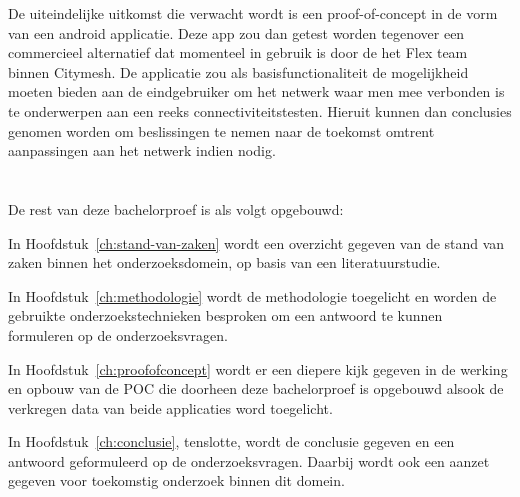 De uiteindelijke uitkomst die verwacht wordt is een proof-of-concept in de vorm van een android applicatie. Deze app zou dan getest worden tegenover een commercieel alternatief dat momenteel in gebruik is door de het Flex team binnen Citymesh. De applicatie zou als basisfunctionaliteit de mogelijkheid moeten bieden aan de eindgebruiker om het netwerk waar men mee verbonden is te onderwerpen aan een reeks connectiviteitstesten. Hieruit kunnen dan conclusies genomen worden om beslissingen te nemen naar de toekomst omtrent aanpassingen aan het netwerk indien nodig.

\section{}%
\label{sec:opzet-bachelorproef}


De rest van deze bachelorproef is als volgt opgebouwd:

In Hoofdstuk~\ref{ch:stand-van-zaken} wordt een overzicht gegeven van de stand van zaken binnen het onderzoeksdomein, op basis van een literatuurstudie.

In Hoofdstuk~\ref{ch:methodologie} wordt de methodologie toegelicht en worden de gebruikte onderzoekstechnieken besproken om een antwoord te kunnen formuleren op de onderzoeksvragen.

In Hoofdstuk~\ref{ch:proofofconcept} wordt er een diepere kijk gegeven in de werking en opbouw van de POC die doorheen deze bachelorproef is opgebouwd alsook de verkregen data van beide applicaties word toegelicht.

In Hoofdstuk~\ref{ch:conclusie}, tenslotte, wordt de conclusie gegeven en een antwoord geformuleerd op de onderzoeksvragen. Daarbij wordt ook een aanzet gegeven voor toekomstig onderzoek binnen dit domein.